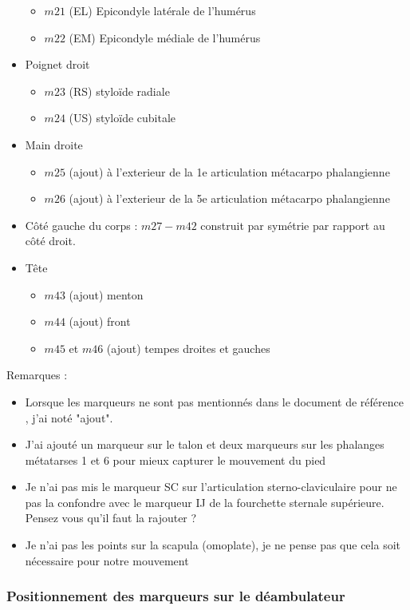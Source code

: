 \documentclass[a4paper, 10pt ]{article}
\begin{document}
\begin{itemize}
\begin{itemize}
\item $m21$ (EL) Epicondyle latérale de l'humérus
\item $m22$ (EM) Epicondyle médiale de l'humérus
\end{itemize}
\item{Poignet droit}
\begin{itemize}
\item $m23$ (RS) styloïde radiale
\item $m24$ (US) styloïde cubitale
\end{itemize}
\item{Main droite}
\begin{itemize}
\item $m25$ (ajout) à l'exterieur de la 1e articulation métacarpo phalangienne
\item $m26$ (ajout) à l'exterieur de la 5e  articulation métacarpo phalangienne
\end{itemize}
\item {Côté gauche du corps} : $m27-m42$ construit par symétrie par rapport au côté droit.
\item {Tête}
\begin{itemize}
\item $m43$ (ajout) menton 
\item $m44$ (ajout) front
\item $m45$ et $m46$ (ajout) tempes droites et gauches
\end{itemize}

\end{itemize}

Remarques :

\begin{itemize}
\item Lorsque les marqueurs ne sont pas mentionnés dans le document de référence \cite{Wu02, Wu05}, j'ai noté "ajout".
\item J'ai ajouté un marqueur sur le talon et deux marqueurs sur les phalanges métatarses 1 et 6  pour mieux capturer le mouvement du pied
\item Je n'ai pas mis le marqueur SC sur l'articulation sterno-claviculaire pour ne pas la confondre avec le marqueur IJ de la fourchette sternale supérieure. Pensez vous qu'il faut la rajouter ?
\item Je n'ai pas les points sur la scapula (omoplate), je ne pense pas que cela soit nécessaire pour notre mouvement
\end{itemize}

\subsubsection{Positionnement des marqueurs sur le déambulateur }
\end{document}
